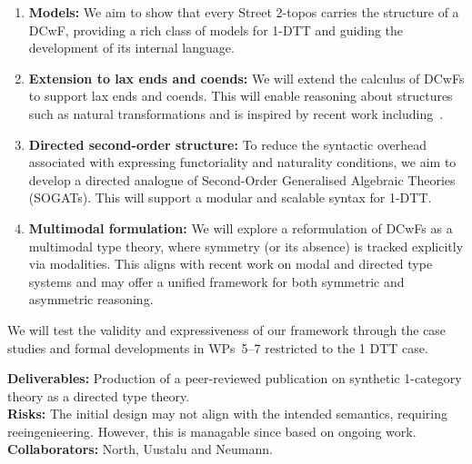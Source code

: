 \documentclass[a4paper,11pt]{article}
\begin{document}
\begin{enumerate}
\item \textbf{Models:} We aim to show that every Street 2-topos carries the structure of a DCwF, providing a rich class of models for 1-DTT and guiding the development of its internal language.

\item \textbf{Extension to lax ends and coends:} We will extend the
  calculus of DCwFs to support lax ends and coends. This will enable
  reasoning about structures such as natural transformations and is
  inspired by recent work including~\cite{north_2019}.  

\item \textbf{Directed second-order structure:} To reduce the
  syntactic overhead associated with expressing functoriality and
  naturality conditions, we aim to develop a directed analogue of
  Second-Order Generalised Algebraic Theories (SOGATs). This will support a modular
  and scalable syntax for 1-DTT. 

\item \textbf{Multimodal formulation:} We will explore a reformulation
  of DCwFs as a multimodal type theory, where symmetry (or its
  absence) is tracked explicitly via modalities. This aligns with
  recent work on modal and directed type systems and may offer a
  unified framework for both symmetric and asymmetric reasoning.
\end{enumerate}

We will test the validity and expressiveness of our 
framework through the case studies and formal developments in
WPs~5--7 restricted to the 1 DTT case.

\textbf{Deliverables:} Production of a peer-reviewed publication on synthetic 1-category
theory as a directed type theory. \\
\textbf{Risks:}
The initial design may not align with the intended semantics,
requiring reeingenieering. However, this is managable since based on
ongoing work.\\
\textbf{Collaborators:}
North, Uustalu and Neumann.

  
\end{document}
